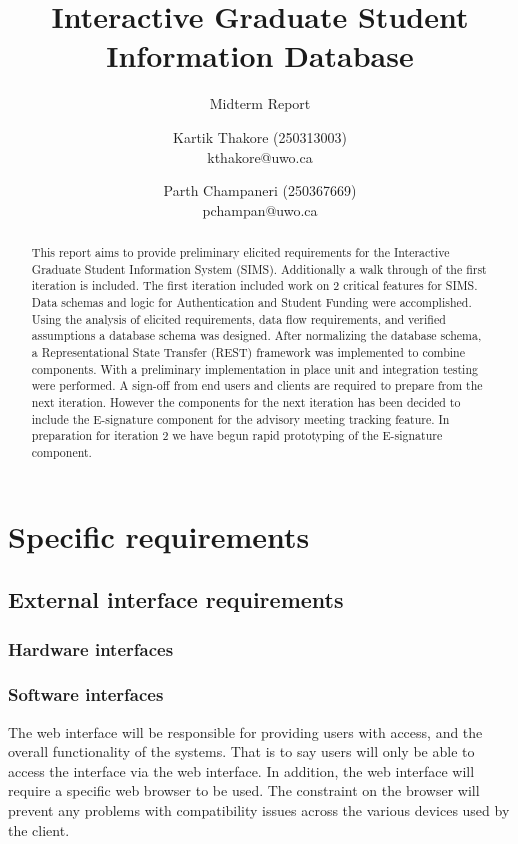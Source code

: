 \documentclass{journal}
\begin{document}

\nocite{*}
\title{Interactive Graduate Student Information Database}
\subtitle{Midterm Report} 
\author{Kartik Thakore (250313003)\\kthakore@uwo.ca \and Parth Champaneri (250367669)\\pchampan@uwo.ca}
\maketitle

\begin{abstract}
This report aims to provide preliminary elicited requirements for the Interactive Graduate Student Information System (SIMS). Additionally a walk through of the first iteration is included. The first iteration included work on 2 critical features for SIMS. Data schemas and logic for Authentication and Student Funding were accomplished. Using the analysis of elicited requirements, data flow requirements, and verified assumptions a database schema was designed. After normalizing the database schema, a Representational State Transfer (REST) framework was implemented to combine components. With a preliminary implementation in place unit and integration testing were performed. A sign-off from end users and clients are required to prepare from the next iteration. However the components for the next iteration has been decided to include the E-signature component for the advisory meeting tracking feature. In preparation for iteration 2 we have begun rapid prototyping of the E-signature component.
\end{abstract}

\section{Specific requirements}
\subsection{External interface requirements}
\subsubsection{Hardware interfaces}
\begin{description}[style=multiline,leftmargin=3cm,font=\normalfont]
\item[Electronic Signature Pad]
\end{description}
\subsubsection{Software interfaces}
\begin{description}[style=multiline,leftmargin=3cm,font=\normalfont]
\item[Web Interface]
The web interface will be responsible for providing users with access, and the overall functionality of the systems. That is to say users will only be able to access the interface via the web interface. In addition, the web interface will require a specific web browser to be used. The constraint on the browser will prevent any problems with compatibility issues across the various devices used by the client. 
\end{description}
\end{document}
